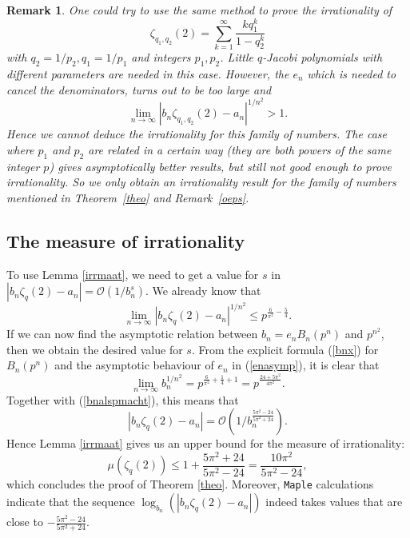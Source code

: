 \documentclass[12pt]{article}
\newtheorem{remark}[theorem]{Remark}
\numberwithin{equation}{section}
\begin{document}
\begin{remark}
\rm One could try to use the same method to prove the irrationality of
\[ \zeta_{q_1,q_2}(2)=\sum_{k=1}^\infty \frac{kq_1^k}{1-q_2^k}\]
with $q_2=1/p_2, q_1=1/p_1$ and integers $p_1,p_2$.  Little $q$-Jacobi
polynomials with different parameters are needed in this case.
However, the $e_n$ which is needed to cancel the denominators,
turns out to be too large and
\[\lim_{n\rightarrow\infty}|b_n\zeta_{q_1,q_2}(2)-a_n|^{1/n^2}>1.\]
Hence we cannot deduce the irrationality for this family of
numbers.  The case where $p_1$ and $p_2$ are related in a certain
way (they are both powers of the same integer $p$) gives
asymptotically better results, but still not good enough to prove
irrationality.  So we only obtain an irrationality result for the
family of numbers mentioned in Theorem~\ref{theo} and
Remark~\ref{oeps}.
\end{remark}

\subsection{The measure of irrationality}

To use Lemma \ref{irrmaat}, we need to get a value for $s$ in
$\left|b_n\zeta_{q}(2)-a_n\right|=\mathcal{O}\left(1/{b_n^s}\right)$.
We already know that
\[\lim_{n\rightarrow\infty} \left|b_n\zeta_{q}(2)-a_n\right|^{1/n^2}\leq
p^{\frac{6}{\pi^2}-\frac{5}{4}}.\]
If we can now find the
asymptotic relation between $b_n=e_nB_n(p^n)$ and
$p^{n^2}$, then we obtain the desired value for $s$.  From the
explicit formula (\ref{bnx}) for $B_n(p^n)$ and the
asymptotic behaviour of $e_n$ in (\ref{enasymp}), it is clear that
\[\lim_{n\rightarrow\infty}b_n^{1/n^2}=p^{\frac{6}{\pi^2}+\frac14+1}=p^{\frac{24+5\pi^2}{4\pi^2}}.\]
Together with (\ref{bnalspmacht}), this means that
\[\left|b_n\zeta_{q}(2)-a_n\right|=\mathcal{O}\left(1/{b_n^\frac{5\pi^2-24}{5\pi^2+24}}\right).\]
Hence Lemma \ref{irrmaat} gives us an upper bound for the
measure of irrationality:
\[\mu\left(\zeta_{q}(2)\right)\leq1+\frac{5\pi^2+24}{5\pi^2-24}=\frac{10\pi^2}{5\pi^2-24},\]
which concludes the proof of Theorem \ref{theo}.  Moreover,
\texttt{Maple} calculations indicate that the sequence
$\log_{b_n}\left(|b_n\zeta_q(2)-a_n|\right)$ indeed takes values
that are close to $-\frac{5\pi^2-24}{5\pi^2+24}$.\\
\end{document}
